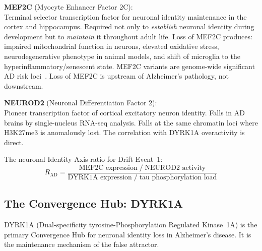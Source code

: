 \documentclass[12pt,a4paper]{article}
\newenvironment{cellenv}[1]{%
  \begin{tcolorbox}[colback=plum!5,colframe=plum,boxrule=1pt,
    arc=3pt,title={\bfseries\color{white}#1},colbacktitle=plum,
    left=8pt,right=8pt,top=6pt,bottom=6pt,breakable]}{%
  \end{tcolorbox}}
\newcommand{\RAD}{R_{\mathrm{AD}}}
\begin{document}
\begin{cellenv}{Cellular Identity Anchor --- Drift Event~1}
\textbf{MEF2C} (Myocyte Enhancer Factor 2C):\\
Terminal selector transcription factor for neuronal
identity maintenance in the cortex and hippocampus.
Required not only to \emph{establish} neuronal identity
during development but to \emph{maintain} it throughout
adult life. Loss of MEF2C produces: impaired mitochondrial
function in neurons, elevated oxidative stress,
neurodegenerative phenotype in animal models, and shift
of microglia to the hyperinflammatory/senescent state.
MEF2C variants are genome-wide significant AD risk
loci~\cite{MolNeuro2024,NatImmuno2025}. Loss of MEF2C
is upstream of Alzheimer's pathology, not downstream.

\medskip\noindent\textbf{NEUROD2} (Neuronal Differentiation
Factor 2):\\
Pioneer transcription factor of cortical excitatory
neuron identity. Falls in AD brains by single-nucleus
RNA-seq analysis. Falls at the same chromatin loci
where H3K27me3 is anomalously lost. The correlation
with DYRK1A overactivity is direct.
\end{cellenv}

The neuronal Identity Axis ratio for Drift Event~1:
\begin{equation}
  \RAD = \frac{\text{MEF2C expression} \; / \;
               \text{NEUROD2 activity}}
              {\text{DYRK1A expression} \; / \;
               \text{tau phosphorylation load}}
  \label{eq:RAD}
\end{equation}

\subsection{The Convergence Hub: DYRK1A}

DYRK1A (Dual-specificity tyrosine-Phosphorylation
Regulated Kinase~1A) is the primary Convergence Hub
for neuronal identity loss in Alzheimer's disease.
It is the maintenance mechanism of the false attractor.
\end{document}
